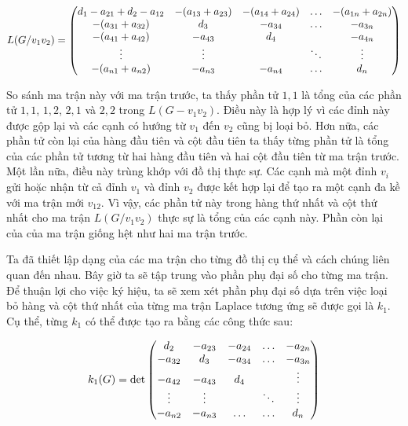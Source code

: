 \documentclass[14pt, a4paper]{article}
\numberwithin{equation}{section}
\numberwithin{figure}{section}
\numberwithin{dl}{section}
\numberwithin{md}{section}
\numberwithin{bd}{section}
\numberwithin{dn}{section}
\numberwithin{hq}{section}
\begin{document}
    \begin{equation}
        L (G / v_1 v_2) = \begin{pmatrix}
            d_1 - a_{21} + d_2 - a_{12} & - (a_{13} + a_{23}) & - (a_{14} + a_{24}) & \hdots & - (a_{1n} + a_{2n}) \\
            - (a_{31} + a_{32}) & d_3 & - a_{34} & \hdots & - a_{3n} \\
            - (a_{41} + a_{42}) & - a_{43} & d_4 & \thickspace & - a_{4n} \\
            \vdots & \vdots & \thickspace & \ddots & \vdots \\
            - (a_{n1} + a_{n2}) & - a_{n3} & - a_{n4} & \hdots & d_n 
        \end{pmatrix}
    \end{equation}

    So sánh ma trận này với ma trận trước, ta thấy phần tử $1, 1$ là tổng của các phần tử $1, 1$, $1, 2$, $2, 1$ và $2, 2$ trong $L(G - v_1 v_2)$.
    Điều này là hợp lý vì các đỉnh này được gộp lại và các cạnh có hướng từ $v_1$ đến $v_2$ cũng bị loại bỏ.
    Hơn nữa, các phần tử còn lại của hàng đầu tiên và cột đầu tiên ta thấy từng phần tử là tổng của các phần tử tương từ hai hàng đầu tiên và hai cột đầu tiên từ ma trận trước.
    Một lần nữa, điều này trùng khớp với đồ thị thực sự.
    Các cạnh mà một đỉnh $v_i$ gửi hoặc nhận từ cả đỉnh $v_1$ và đỉnh $v_2$ được kết hợp lại để tạo ra một cạnh đa kề với ma trận mới $v_{12}$.
    Vì vậy, các phần tử này trong hàng thứ nhất và cột thứ nhất cho ma trận $L(G/v_1 v_2)$ thực sự là tổng của các cạnh này.
    Phần còn lại của của ma trận giống hệt như hai ma trận trước.

    Ta đã thiết lập dạng của các ma trận cho từng đồ thị cụ thể và cách chúng liên quan đến nhau.
    Bây giờ ta sẽ tập trung vào phần phụ đại số  cho từng ma trận.
    Để thuận lợi cho việc ký hiệu, ta sẽ xem xét phần phụ đại số dựa trên việc loại bỏ hàng và cột thứ nhất của từng ma trận Laplace tương ứng sẽ được gọi là $k_1$.
    Cụ thể, từng $k_1$ có thể được tạo ra bằng các công thức sau:

    \begin{equation}
        k_1(G) = \det\begin{pmatrix}
            d_2 & - a_{23} & - a_{24} & \hdots & - a_{2n} \\
            - a_{32} & d_3 & - a_{34} & \hdots & - a_{3n} \\
            - a_{42} & - a_{43} & d_4 & \thickspace & \vdots \\
            \vdots & \vdots & \thickspace & \ddots & \vdots \\
            - a_{n2} & - a_{n3} & \hdots & \hdots & d_n
        \end{pmatrix}
    \end{equation}
\end{document}
